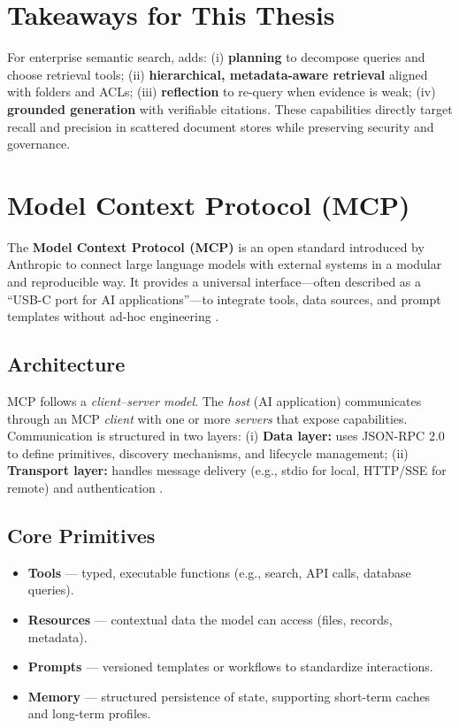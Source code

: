 \section{Takeaways for This Thesis}
For enterprise semantic search,  adds:
(i) \textbf{planning} to decompose queries and choose retrieval tools;
(ii) \textbf{hierarchical, metadata-aware retrieval} aligned with folders and ACLs;
(iii) \textbf{reflection} to re-query when evidence is weak;
(iv) \textbf{grounded generation} with verifiable citations. 
These capabilities directly target recall and precision in scattered document stores while preserving security and governance.

\section{Model Context Protocol (MCP)}

The \textbf{Model Context Protocol (MCP)} is an open standard introduced by Anthropic to connect large language models with external systems in a modular and reproducible way. It provides a universal interface---often described as a ``USB-C port for AI applications''---to integrate tools, data sources, and prompt templates without ad-hoc engineering \cite{mcp-intro}.

\subsection{Architecture} 
MCP follows a \textit{client--server model}. The \textit{host} (AI application) communicates through an MCP \textit{client} with one or more \textit{servers} that expose capabilities. Communication is structured in two layers:
(i) \textbf{Data layer:} uses JSON-RPC 2.0 to define primitives, discovery mechanisms, and lifecycle management;
(ii) \textbf{Transport layer:} handles message delivery (e.g., stdio for local, HTTP/SSE for remote) and authentication \cite{mcp-architecture}.


\subsection{Core Primitives} 
\begin{itemize}
  \item \textbf{Tools} --- typed, executable functions (e.g., search, API calls, database queries).
  \item \textbf{Resources} --- contextual data the model can access (files, records, metadata).
  \item \textbf{Prompts} --- versioned templates or workflows to standardize interactions.
  \item \textbf{Memory} --- structured persistence of state, supporting short-term caches and long-term profiles.
\end{itemize}

